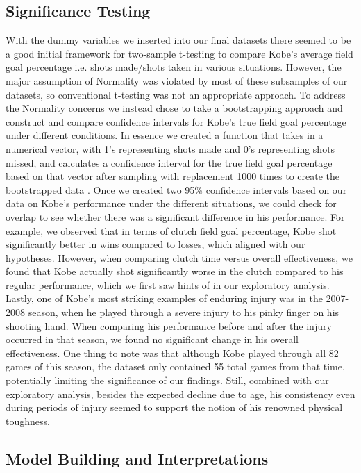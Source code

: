 \documentclass[paper=a4, fontsize=11pt]{scrartcl} %
\numberwithin{equation}{section} %
\numberwithin{figure}{section} %
\numberwithin{table}{section} %
\begin{document}
\subsection{Significance Testing}
\hspace*{1cm}With the dummy variables we inserted into our final datasets there seemed to be a good initial framework for two-sample t-testing to compare Kobe's average field goal percentage i.e. shots made/shots taken in various situations. However, the major assumption of Normality was violated by most of these subsamples of our datasets, so conventional t-testing was not an appropriate approach. To address the Normality concerns we instead chose to take a bootstrapping approach and construct and compare confidence intervals for Kobe's true field goal percentage under different conditions. In essence we created a function that takes in a numerical vector, with 1's representing shots made and 0's representing shots missed, and calculates a confidence interval for the true field goal percentage based on that vector after sampling with replacement 1000 times to create the bootstrapped data \cite{bootstraptheory}. Once we created two 95\% confidence intervals based on our data on Kobe's performance under the different situations, we could check for overlap to see whether there was a significant difference in his performance. For example, we observed that in terms of clutch field goal percentage, Kobe shot significantly better in wins compared to losses, which aligned with our hypotheses. However, when comparing clutch time versus overall effectiveness, we found that Kobe actually shot significantly worse in the clutch compared to his regular performance, which we first saw hints of in our exploratory analysis. Lastly, one of Kobe's most striking examples of enduring injury was in the 2007-2008 season, when he played through a severe injury to his pinky finger on his shooting hand. When comparing his performance before and after the injury occurred in that season, we found no significant change in his overall effectiveness. One thing to note was that although Kobe played through all 82 games of this season, the dataset only contained 55 total games from that time, potentially limiting the significance of our findings. Still, combined with our exploratory analysis, besides the expected decline due to age, his consistency even during periods of injury seemed to support the notion of his renowned physical toughness.
\subsection{Model Building and Interpretations}
\end{document}
